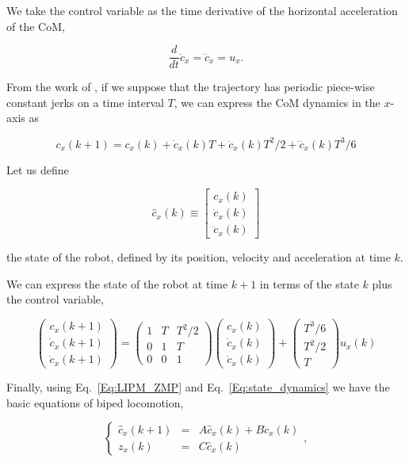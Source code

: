 We take the control variable as the time derivative of the horizontal acceleration of the CoM,

$$
\dfrac{d}{dt}\ddot{c}_x = \dddot{c}_x= u_x.
$$

From the  work of \citep{Kajita2003}, if we suppose that the trajectory has periodic piece-wise constant jerks on a time interval $T$, we can express the CoM dynamics in the $x$-axis as

$$
c_x(k+1) = c_x(k) + \dot{c}_x(k) T + \ddot{c}_x(k) T^2/2 + \dddot{c}_x(k) T^3/6
$$

Let us define

$$
\hat{c}_x(k) \equiv 
\left[
\begin{matrix}
c_x(k) \\ 
\dot{c}_x(k)\\
\ddot{c}_x(k) 
\end{matrix}
\right]
$$ 

the state of the robot, defined by its position, velocity and acceleration at time $k$. 

We can express the state of the robot at time $k+1$ in terms of the state $k$ plus the control variable,

\begin{equation}
\label{Eq:state_dynamics}
\left(
\begin{matrix}
c_x(k+1) \\ 
\dot{c}_x(k+1)\\
\ddot{c}_x(k+1) 
\end{matrix}
\right) =
\left(
\begin{matrix}
1 & T & T^2/2 \\
0 & 1 & T \\
0 & 0 & 1
\end{matrix}
\right)
\left(
\begin{matrix}
c_x(k) \\ 
\dot{c}_x(k)\\
\ddot{c}_x(k) 
\end{matrix}
\right) +
\left(
\begin{matrix}
T^3/6 \\
T^2/2 \\
T
\end{matrix}
\right)
u_x(k)
\end{equation}

Finally, using Eq.~\ref{Eq:LIPM_ZMP} and Eq.~\ref{Eq:state_dynamics} we have the basic equations of biped locomotion,

\begin{equation}
\label{Eq:basic_dynamic_equations}
\left\{
\begin{array}{ccc}
 \hat{c}_x(k+1) &=&  A \hat{c}_x(k) + B \dddot{c}_x(k)\\
 z_x(k) &=& C \hat{c}_x(k)
\end{array}
\right.,
\end{equation}

